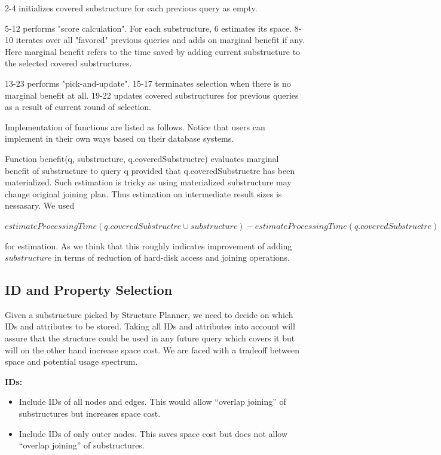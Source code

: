 2-4 initializes covered substructure for each previous query as empty.

5-12 performs "score calculation". For each substructure, 6 estimates its space. 8-10 iterates over all "favored" previous queries and adds on marginal benefit if any. Here marginal benefit refers to the time saved by adding current substructure to the selected covered substructures.   

13-23 performs "pick-and-update". 15-17 terminates selection when there is no marginal benefit at all. 19-22 updates covered substructures for previous queries as a result of current round of selection.

Implementation of functions are listed as follows. Notice that users can implement in their own ways based on their database systems. 



 Function benefit(q, substructure, q.coveredSubstructre) evaluates marginal benefit of substructure to query q provided that q.coveredSubstructre has been materialized. Such estimation is tricky as using materialized substructure may change original joining plan. Thus estimation on intermediate result sizes is nessasary.  We used 
 
 $estimateProcessingTime(q.coveredSubstructre \cup substructure) - estimateProcessingTime(q.coveredSubstructre)$
 
 for estimation. As we think that this roughly indicates improvement of adding $substructure$ in terms of  reduction of hard-disk access and joining operations. 
 


\subsection{ID and Property Selection}

Given a substructure picked by Structure Planner, we need to decide on which IDs and attributes to be stored. Taking all IDs and attributes into account will assure that the structure could be used in any future query which covers it but will on the other hand increase space cost. We are faced with a tradeoff between space and potential usage spectrum.

\textbf{IDs:}
\begin{itemize}
	\item Include IDs of all nodes and edges. This would allow “overlap joining” of substructures but increases space cost.
	\item Include IDs of only outer nodes. This saves space cost but does not allow “overlap joining” of substructures.
	
\end{itemize}


